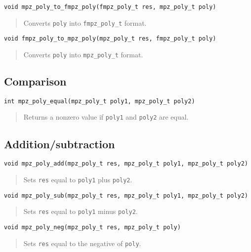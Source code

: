 \documentclass[a4paper,10pt]{article}
\newcommand{\code}{\lstinline}
\begin{document}
\begin{lstlisting}
void mpz_poly_to_fmpz_poly(fmpz_poly_t res, mpz_poly_t poly)
\end{lstlisting}
\begin{quote}
Converts \code{poly} into \code{fmpz_poly_t} format.
\end{quote}

\begin{lstlisting}
void fmpz_poly_to_mpz_poly(mpz_poly_t res, fmpz_poly_t poly)
\end{lstlisting}
\begin{quote}
Converts \code{poly} into \code{mpz_poly_t} format.
\end{quote}



\subsection{Comparison}


\begin{lstlisting}
int mpz_poly_equal(mpz_poly_t poly1, mpz_poly_t poly2)
\end{lstlisting}
\begin{quote}
Returns a nonzero value if \code{poly1} and \code{poly2} are equal.
\end{quote}



\subsection{Addition/subtraction}


\begin{lstlisting}
void mpz_poly_add(mpz_poly_t res, mpz_poly_t poly1, mpz_poly_t poly2)
\end{lstlisting}
\begin{quote}
Sets \code{res} equal to \code{poly1} plus \code{poly2}.
\end{quote}

\begin{lstlisting}
void mpz_poly_sub(mpz_poly_t res, mpz_poly_t poly1, mpz_poly_t poly2)
\end{lstlisting}
\begin{quote}
Sets \code{res} equal to \code{poly1} minus \code{poly2}.
\end{quote}

\begin{lstlisting}
void mpz_poly_neg(mpz_poly_t res, mpz_poly_t poly)
\end{lstlisting}
\begin{quote}
Sets \code{res} equal to the negative of \code{poly}.
\end{quote}
\end{document}
